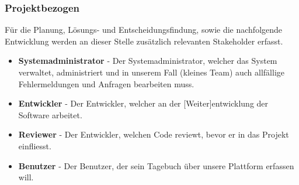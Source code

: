 \subsubsection*{Projektbezogen}
Für die Planung, Lösungs- und Entscheidungsfindung, sowie die nachfolgende Entwicklung werden an dieser Stelle zusätzlich relevanten Stakeholder erfasst.
\begin{itemize}
  \item \textbf{Systemadministrator} - Der Systemadministrator, welcher das System verwaltet, administriert und in unserem Fall (kleines Team) auch allfällige Fehlermeldungen und Anfragen bearbeiten muss.
  \item \textbf{Entwickler} - Der Entwickler, welcher an der [Weiter]entwicklung der Software arbeitet.
  \item \textbf{Reviewer} - Der Entwickler, welchen Code reviewt, bevor er in das Projekt einfliesst.
  \item \textbf{Benutzer} - Der Benutzer, der sein Tagebuch über unsere Plattform erfassen will.
\end{itemize}
